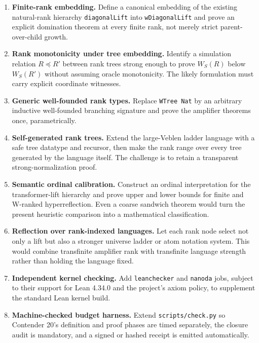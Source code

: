 \documentclass[11pt]{article}
\theoremstyle{definition}
\newcommand{\code}[1]{\texttt{#1}}
\begin{document}
\begin{enumerate}[leftmargin=2.2em]
  \item \textbf{Finite-rank embedding.}  Define a canonical embedding of the
  existing natural-rank hierarchy \code{diagonalLift} into
  \code{wDiagonalLift} and prove an explicit domination theorem at every finite
  rank, not merely strict parent-over-child growth.

  \item \textbf{Rank monotonicity under tree embedding.}  Identify a
  simulation relation \(R\preccurlyeq R'\) between rank trees strong enough to
  prove \(W_S(R)\) below \(W_S(R')\) without assuming oracle monotonicity.
  The likely formulation must carry explicit coordinate witnesses.

  \item \textbf{Generic well-founded rank types.}  Replace \code{WTree Nat}
  by an arbitrary inductive well-founded branching signature and prove the
  amplifier theorems once, parametrically.

  \item \textbf{Self-generated rank trees.}  Extend the large-Veblen ladder
  language with a safe tree datatype and recursor, then make the rank range over
  every tree generated by the language itself.  The challenge is to retain a
  transparent strong-normalization proof.

  \item \textbf{Semantic ordinal calibration.}  Construct an ordinal
  interpretation for the transformer-lift hierarchy and prove upper and lower
  bounds for finite and W-ranked hyperreflection.  Even a coarse sandwich
  theorem would turn the present heuristic comparison into a mathematical
  classification.

  \item \textbf{Reflection over rank-indexed languages.}  Let each rank node
  select not only a lift but also a stronger universe ladder or atom notation
  system.  This would combine transfinite amplifier rank with transfinite
  language strength rather than holding the language fixed.

  \item \textbf{Independent kernel checking.}  Add \code{leanchecker} and
  \code{nanoda} jobs, subject to their support for Lean 4.34.0 and the project's
  axiom policy, to supplement the standard Lean kernel build.

  \item \textbf{Machine-checked budget harness.}  Extend
  \code{scripts/check.py} so Contender 20's definition and proof phases are
  timed separately, the closure audit is mandatory, and a signed or hashed
  receipt is emitted automatically.
\end{enumerate}
\end{document}
